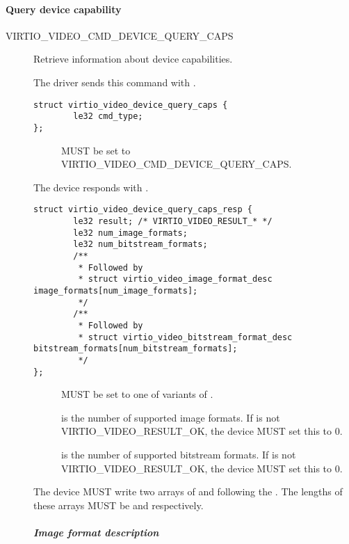 \paragraph{Query device capability}

\begin{description}
\item[VIRTIO_VIDEO_CMD_DEVICE_QUERY_CAPS] Retrieve information about device
  capabilities.

The driver sends this command with .
\begin{lstlisting}
struct virtio_video_device_query_caps {
        le32 cmd_type;
};
\end{lstlisting}
\begin{description}
\item[] MUST be set to VIRTIO_VIDEO_CMD_DEVICE_QUERY_CAPS.
\end{description}

The device responds with .
\begin{lstlisting}
struct virtio_video_device_query_caps_resp {
        le32 result; /* VIRTIO_VIDEO_RESULT_* */
        le32 num_image_formats;
        le32 num_bitstream_formats;
        /**
         * Followed by
         * struct virtio_video_image_format_desc image_formats[num_image_formats];
         */
        /**
         * Followed by
         * struct virtio_video_bitstream_format_desc bitstream_formats[num_bitstream_formats];
         */
};
\end{lstlisting}
\begin{description}
\item[] MUST be set to one of variants of .
\item[] is the number of supported image formats. If
   is not VIRTIO_VIDEO_RESULT_OK, the device MUST set this to 0.
\item[] is the number of supported bitstream
  formats. If  is not VIRTIO_VIDEO_RESULT_OK, the device MUST set
  this to 0.
\end{description}

The device MUST write two arrays of  and  following the . The lengths of these arrays MUST be
 and  respectively.
\subparagraph{Image format description}


\end{description}
